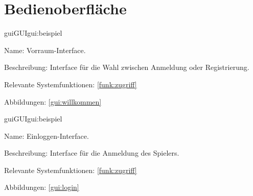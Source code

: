 
\section{Bedienoberfläche}


\setcounter{gui}{10}

\begin{description}[leftmargin=5em, style=sameline]	
	\begin{lhp}{gui}{GUI}{gui:beispiel}
		\item[Name:] Vorraum-Interface.
		\item[Beschreibung:] Interface für die Wahl zwischen Anmeldung oder Registrierung.
		\item[Relevante Systemfunktionen:] \ref{funk:zugriff}
		\item[Abbildungen:] \ref{gui:willkommen}
	\end{lhp}
\end{description}
\begin{description}[leftmargin=5em, style=sameline]	
	\begin{lhp}{gui}{GUI}{gui:beispiel}
		\item[Name:] Einloggen-Interface.
		\item[Beschreibung:] Interface für die Anmeldung des Spielers.
		\item[Relevante Systemfunktionen:] \ref{funk:zugriff}
		\item[Abbildungen:] \ref{gui:login}
	\end{lhp}
\end{description}

